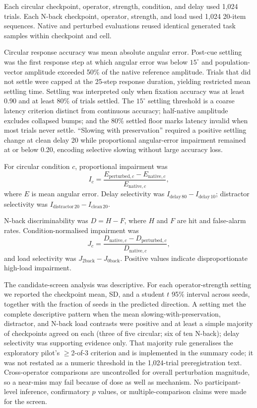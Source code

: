 Each circular checkpoint, operator, strength, condition, and delay used 1,024
trials. Each N-back checkpoint, operator, strength, and load used 1,024
20-item sequences. Native and perturbed evaluations reused identical generated
task samples within checkpoint and cell.

Circular response accuracy was mean absolute angular error. Post-cue settling
was the first response step at which angular error was below $15^\circ$ and
population-vector amplitude exceeded 50\% of the native reference amplitude.
Trials that did not settle were capped at the 25-step response duration,
yielding restricted mean settling time. Settling was interpreted only when
fixation accuracy was at least 0.90 and at least 80\% of trials settled.
The $15^\circ$ settling threshold is a coarse latency criterion distinct from
continuous accuracy; half-native amplitude excludes collapsed bumps; and the
80\% settled floor marks latency invalid when most trials never settle.
``Slowing with preservation'' required a positive settling change at clean
delay 20 while proportional angular-error impairment remained at or below
0.20, encoding selective slowing without large accuracy loss.

For circular condition $c$, proportional impairment was
\begin{equation}
 I_c=\frac{E_{\mathrm{perturbed},c}-E_{\mathrm{native},c}}
 {E_{\mathrm{native},c}},
\end{equation}
where $E$ is mean angular error. Delay selectivity was
$I_{\mathrm{delay\,80}}-I_{\mathrm{delay\,10}}$; distractor selectivity was
$I_{\mathrm{distractor\,20}}-I_{\mathrm{clean\,20}}$.

N-back discriminability was $D=H-F$, where $H$ and $F$ are hit and false-alarm
rates. Condition-normalised impairment was
\begin{equation}
 J_c=\frac{D_{\mathrm{native},c}-D_{\mathrm{perturbed},c}}
 {D_{\mathrm{native},c}},
\end{equation}
and load selectivity was $J_{\mathrm{2back}}-J_{\mathrm{0back}}$. Positive
values indicate disproportionate high-load impairment.

The candidate-screen analysis was descriptive. For each operator-strength
setting we reported the checkpoint mean, SD, and a student $t$ 95\% interval
across seeds, together with the fraction of seeds in the predicted direction.
A setting met the complete descriptive pattern when the mean
slowing-with-preservation, distractor, and N-back load contrasts were positive
and at least a simple majority of checkpoints agreed on each (three of five
circular; six of ten N-back); delay selectivity was supporting evidence only.
That majority rule generalises the exploratory pilot's $\ge$2-of-3 criterion
and is implemented in the summary code; it was not restated as a numeric
threshold in the 1,024-trial preregistration text. Cross-operator comparisons
are uncontrolled for overall perturbation magnitude, so a near-miss may fail
because of dose as well as mechanism. No participant-level inference,
confirmatory $p$ values, or multiple-comparison claims were made for the
screen.
